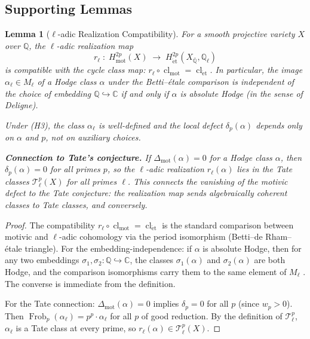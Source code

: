 \documentclass[11pt]{article}
\newtheorem{lemma}[theorem]{Lemma}
\theoremstyle{definition}
\DeclareMathOperator{\cl}{cl}
\DeclareMathOperator{\Frob}{Frob}
\begin{document}
\subsection{Supporting Lemmas}

\begin{lemma}[$\ell$-adic Realization Compatibility]
\label{lem:ell-adic}
For a smooth projective variety $X$ over $\mathbb{Q}$, the $\ell$-adic
realization map
\[
  r_\ell \;:\; H^{2p}_{\mathrm{mot}}(X)
  \;\longrightarrow\;
  H^{2p}_{\mathrm{\acute{e}t}}(X_{\bar{\mathbb{Q}}}, \mathbb{Q}_\ell)
\]
is compatible with the cycle class map:
$r_\ell \circ \cl_{\mathrm{mot}} = \cl_{\mathrm{\acute{e}t}}$.
In particular, the image $\alpha_\ell \in M_\ell$ of a Hodge class
$\alpha$ under the Betti--\'etale comparison is independent of the
choice of embedding $\mathbb{Q} \hookrightarrow \mathbb{C}$ if and
only if $\alpha$ is absolute Hodge (in the sense of Deligne).

Under \emph{(H3)}, the class $\alpha_\ell$ is well-defined
and the local defect $\delta_p(\alpha)$ depends only on $\alpha$ and $p$,
not on auxiliary choices.

\smallskip\noindent\textbf{Connection to Tate's conjecture.}
If $\Delta_{\mathrm{mot}}(\alpha) = 0$ for a Hodge class $\alpha$,
then $\delta_p(\alpha) = 0$ for all primes $p$, so
the $\ell$-adic realization $r_\ell(\alpha)$ lies in the Tate classes
$\mathcal{T}_\ell^p(X)$ for all primes $\ell$.  This connects the
vanishing of the motivic defect to the Tate conjecture: the realization
map sends algebraically coherent classes to Tate classes, and conversely.
\end{lemma}

\begin{proof}
The compatibility $r_\ell \circ \cl_{\mathrm{mot}} = \cl_{\mathrm{\acute{e}t}}$
is the standard comparison between motivic and $\ell$-adic cohomology
via the period isomorphism (Betti--de Rham--\'etale triangle).  For
the embedding-independence: if $\alpha$ is absolute Hodge, then for any
two embeddings $\sigma_1, \sigma_2 : \mathbb{Q} \hookrightarrow \mathbb{C}$,
the classes $\sigma_1(\alpha)$ and $\sigma_2(\alpha)$ are both Hodge,
and the comparison isomorphisms carry them to the same element of $M_\ell$
\cite{Deligne}.  The converse is immediate from the definition.

For the Tate connection: $\Delta_{\mathrm{mot}}(\alpha) = 0$ implies
$\delta_p = 0$ for all $p$ (since $w_p > 0$).  Then
$\Frob_p(\alpha_\ell) = p^p \cdot \alpha_\ell$ for all $p$ of good
reduction.  By the definition of $\mathcal{T}_\ell^p$, $\alpha_\ell$ is
a Tate class at every prime, so $r_\ell(\alpha) \in \mathcal{T}_\ell^p(X)$.
\end{proof}
\end{document}
